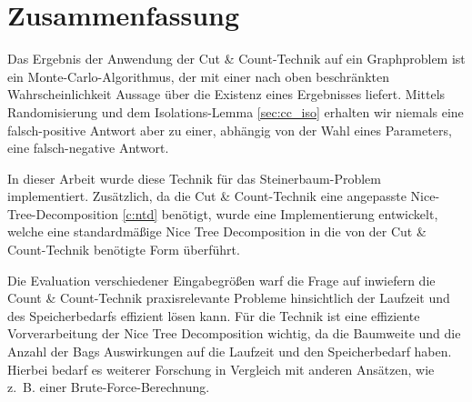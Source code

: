 \chapter{Zusammenfassung}
\label{c:summary}
Das Ergebnis der Anwendung der Cut \& Count-Technik auf ein Graphproblem ist ein Monte-Carlo-Algorithmus, der mit einer nach oben beschränkten Wahrscheinlichkeit Aussage über die Existenz eines Ergebnisses liefert. Mittels Randomisierung und dem Isolations-Lemma \ref{sec:cc_iso} erhalten wir niemals eine falsch-positive Antwort aber zu einer, abhängig von der Wahl eines Parameters, eine falsch-negative Antwort. 

In dieser Arbeit wurde diese Technik für das Steinerbaum-Problem implementiert. Zusätzlich, da die Cut \& Count-Technik eine angepasste Nice-Tree-Decomposition \ref{c:ntd} benötigt, wurde eine Implementierung entwickelt, welche eine standardmäßige Nice Tree Decomposition in die von der Cut \& Count-Technik benötigte Form überführt.

Die Evaluation verschiedener Eingabegrößen warf die Frage auf inwiefern die Count \& Count-Technik praxisrelevante Probleme hinsichtlich der Laufzeit und des Speicherbedarfs effizient lösen kann. 
Für die Technik ist eine effiziente Vorverarbeitung der Nice Tree Decomposition wichtig, da die Baumweite und die Anzahl der Bags Auswirkungen auf die Laufzeit und den Speicherbedarf haben.
Hierbei bedarf es weiterer Forschung in Vergleich mit anderen Ansätzen, wie z.~B. einer Brute-Force-Berechnung.



